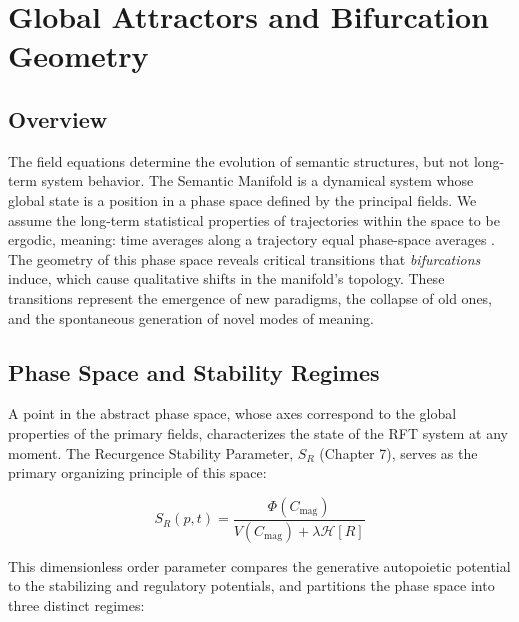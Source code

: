 \chapter{Global Attractors and Bifurcation Geometry}
\label{ch:global_attractors_and_bifurcation_geometry}


\section{Overview}

The field equations determine the evolution of semantic structures, but not long-term system behavior. The Semantic Manifold is a dynamical system whose global state is a position in a phase space defined by the principal fields. We assume the long-term statistical properties of trajectories within the space to be ergodic, meaning: time averages along a trajectory equal phase-space averages \autocite{Birkhoff1931}. The geometry of this phase space reveals critical transitions that \textit{bifurcations} induce, which cause qualitative shifts in the manifold's topology. These transitions represent the emergence of new paradigms, the collapse of old ones, and the spontaneous generation of novel modes of meaning.


\section{Phase Space and Stability Regimes}
\label{sec:phase_space_and_stability_regimes}

A point in the abstract phase space, whose axes correspond to the global properties of the primary fields, characterizes the state of the RFT system at any moment. The Recurgence Stability Parameter, \(S_R\) (Chapter 7), serves as the primary organizing principle of this space:

\begin{equation}
S_R(p,t) = \frac{\Phi(C_{\mathrm{mag}})}{V(C_{\mathrm{mag}}) + \lambda \mathcal{H}[R]}
\end{equation}

This dimensionless order parameter compares the generative autopoietic potential to the stabilizing and regulatory potentials, and partitions the phase space into three distinct regimes:

